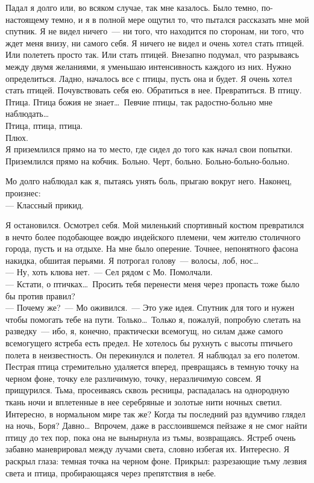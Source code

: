 Падал я долго или, во всяком случае, так мне казалось. Было темно, 
по-настоящему темно, и я в полной мере ощутил то, что пытался рассказать мне мой спутник. Я 
не видел ничего~--- ни того, что находится по сторонам, ни того, что ждет меня 
внизу, ни самого себя. Я ничего не видел и очень хотел стать птицей. Или полететь 
просто так. Или стать птицей. Внезапно подумал, что разрываясь между двумя 
желаниями, я уменьшаю интенсивность каждого из них. Нужно определиться. Ладно, 
началось все с птицы, пусть она и будет. Я очень хотел стать птицей. 
Почувствовать себя ею. Обратиться в нее. Превратиться. В птицу. Птица. Птица 
божия не знает\ldots\ Певчие птицы, так радостно-больно мне наблюдать\ldots\\
Птица, птица, птица.\\
Плюх.\\
Я приземлился прямо на то место, где сидел до того как начал свои попытки. 
Приземлился прямо на кобчик. Больно. Черт, больно. Больно-больно-больно.

Мо долго наблюдал как я, пытаясь унять боль, прыгаю вокруг него. Наконец, 
произнес:\\
--- Классный прикид.

Я остановился. Осмотрел себя. Мой миленький спортивный костюм превратился в 
нечто более подобающее вождю индейского племени, чем жителю столичного города, 
пусть и на отдыхе. На мне было оперение. Точнее, непонятного фасона накидка, 
обшитая перьями. Я потрогал голову~--- волосы, лоб, нос\ldots\\
--- Ну, хоть клюва нет.~--- Сел рядом с Мо. Помолчали.\\
--- Кстати, о птичках\ldots\ Просить тебя перенести меня через пропасть тоже было 
бы против правил?\\
--- Почему же?~--- Мо оживился.~--- Это уже идея. Спутник для того и нужен чтобы 
помогать тебе на пути. Только\ldots\ Только я, пожалуй, попробую слетать на 
разведку~--- ибо, я, конечно, практически всемогущ, но силам даже самого всемогущего 
ястреба есть предел. Не хотелось бы рухнуть с высоты птичьего полета в 
неизвестность.
Он перекинулся и полетел. Я наблюдал за его полетом. Пестрая птица стремительно 
удаляется вперед, превращаясь в темную точку на черном фоне, точку еле 
различимую, точку, неразличимую совсем. Я прищурился. Тьма, просеиваясь сквозь 
ресницы, распадалась на однородную ткань ночи и вплетенные в нее серебряные и 
золотые нити ночных светил. Интересно, в нормальном мире так же? Когда ты 
последний раз вдумчиво глядел на ночь, Боря? Давно\ldots\ Впрочем, даже в 
расслоившемся пейзаже я не смог найти птицу до тех пор, пока она не вынырнула 
из тьмы, возвращаясь. Ястреб очень забавно маневрировал между лучами света, словно 
избегая их. Интересно. Я раскрыл глаза: темная точка на черном фоне. Прикрыл: 
разрезающие тьму лезвия света и птица, пробирающаяся через препятствия в небе.

